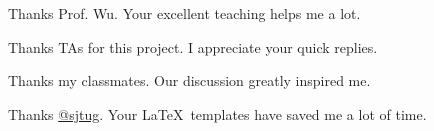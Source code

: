 
\begin{acknowledgements}
  Thanks Prof. Wu. Your excellent teaching helps me a lot.
  
  Thanks TAs for this project. I appreciate your quick replies.
  
  Thanks my classmates. Our discussion greatly inspired me.
  
  Thanks \href{https://github.com/sjtug}{@sjtug}. Your \LaTeX\ templates have saved me a lot of time.
\end{acknowledgements}

